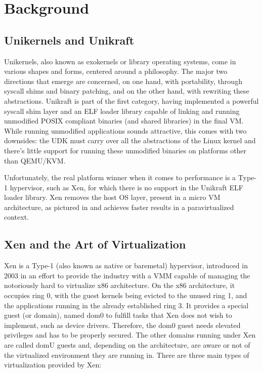 \chapter{Background}
\label{chapter:background}

\section{Unikernels and Unikraft}
\label{sec:unikernels-unikraft}

Unikernels, also known as exokernels or library operating systems, come in various shapes and forms, centered around a philosophy.
The major two directions that emerge are concerned, on one hand, with portability, through syscall shims and binary patching, and on the other hand, with rewriting these abstractions.
Unikraft is part of the first category, having implemented a powerful syscall shim layer and an ELF loader library capable of linking and running unmodified POSIX compliant binaries (and shared libraries) in the final VM.
While running unmodified applications sounds attractive, this comes with two downsides: the UDK must carry over all the abstractions of the Linux kernel and there's little support for running these unmodified binaries on platforms other than QEMU/KVM.

Unfortunately, the real platform winner when it comes to performance is a Type-1 hypervisor, such as Xen, for which there is no support in the Unikraft ELF loader library.
Xen removes the host OS layer, present in a micro VM architecture, as pictured in  and achieves faster results in a paravirtualized context.


\section{Xen and the Art of Virtualization}
\label{sec:xen}

Xen is a Type-1 (also known as native or baremetal) hypervisor, introduced in 2003 in an effort to provide the industry with a VMM capable of managing the notoriously hard to virtualize x86 architecture.
On the x86 architecture, it occupies ring 0, with the guest kernels being evicted to the unused ring 1, and the applications running in the already established ring 3.
It provides a special guest (or domain), named dom0 to fulfill tasks that Xen does not wish to implement, such as device drivers.
Therefore, the dom0 guest needs elevated privileges and has to be properly secured.
The other domains running under Xen are called domU guests and, depending on the architecture, are aware or not of the virtualized environment they are running in.
There are three main types of virtualization provided by Xen:

